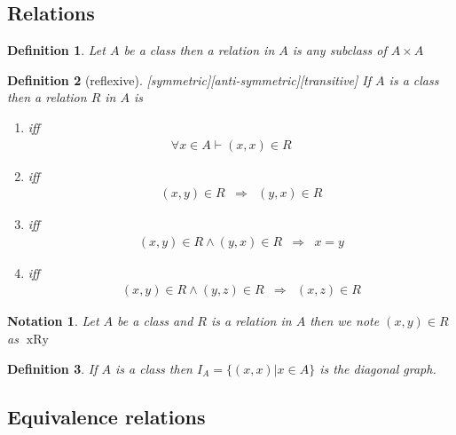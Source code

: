 \documentclass{book}
\newcommand{\nobracket}{}
\newcommand{\tmop}[1]{\ensuremath{\operatorname{#1}}}
\newtheorem{definition}{Definition}
{\theorembodyfont{\rmfamily}\newtheorem{example}{Example}}
\newtheorem{notation}{Notation}
{\theorembodyfont{\rmfamily}\newtheorem{note}{Note}}
\begin{document}
{{\subsection{Relations}

\begin{definition}
  {}Let $A$ be a class then a relation in $A$ is any subclass
  of $A \times A$
\end{definition}

\begin{definition}[reflexive][symmetric][anti-symmetric][transitive]
  {}{}{}{}If
  $A$ is a class then a relation $R$ in $A$ is
  \begin{enumerate}
    \item iff
    \begin{eqnarray*}
      \forall x \in A \vdash (x, x) \in R &  & 
    \end{eqnarray*}
    \item  iff
    \begin{eqnarray*}
      (x, y) \in R & \Rightarrow & (y, x) \in R
    \end{eqnarray*}
    \item  iff
    \begin{eqnarray*}
      (x, y) \in R \wedge (y, x) \in R & \Rightarrow & x = y
    \end{eqnarray*}
    \item  iff
    \begin{eqnarray*}
      (x, y) \in R \wedge (y, z) \in R & \Rightarrow & (x, z) \in R
    \end{eqnarray*}
  \end{enumerate}
\end{definition}

\begin{notation}
  Let $A$ be a class and $R$ is a relation in $A$ then we note $(x, y) \in R$
  as $\tmop{xRy}$
\end{notation}

\begin{definition}
  If $A$ is a class then $I_A = \{ (x, x) | x \in A \nobracket \}$ is the
  diagonal graph.
\end{definition}

\subsection{Equivalence relations}

}}
\end{document}
